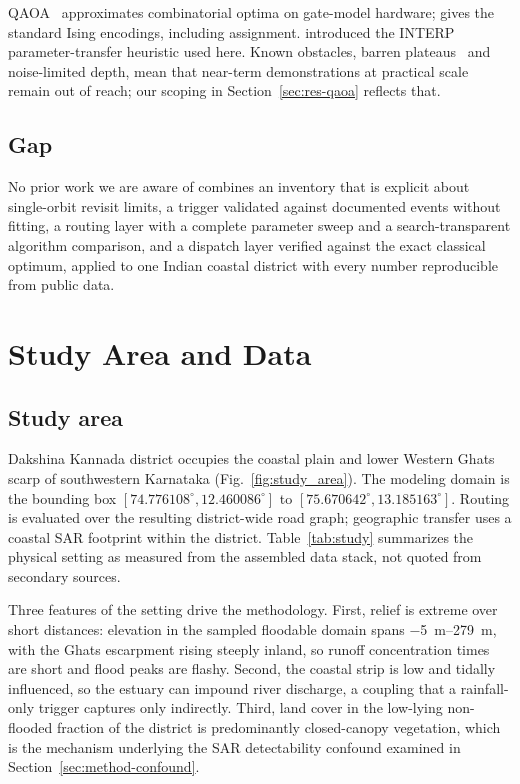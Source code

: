 \documentclass[10pt,twocolumn]{article}
\begin{document}
QAOA~\citep{farhi2014} approximates combinatorial optima on gate-model hardware;
\citet{lucas2014} gives the standard Ising encodings, including assignment.
\citet{zhou2020} introduced the INTERP parameter-transfer heuristic used here.
Known obstacles, barren plateaus~\citep{mcclean2018} and noise-limited depth,
mean that near-term demonstrations at practical scale remain out of reach; our
scoping in Section~\ref{sec:res-qaoa} reflects that.

\subsection{Gap}
No prior work we are aware of combines an inventory that is explicit about
single-orbit revisit limits, a trigger validated against documented events
without fitting, a routing layer with a complete parameter sweep and a
search-transparent algorithm comparison, and a dispatch layer verified against
the exact classical optimum, applied to one Indian coastal district with every
number reproducible from public data.

\section{Study Area and Data}
\label{sec:study}

\subsection{Study area}
Dakshina Kannada district occupies the coastal plain and lower Western Ghats
scarp of southwestern Karnataka (Fig.~\ref{fig:study_area}). The modeling
domain is the bounding box $[74.776108^\circ, 12.460086^\circ]$ to
$[75.670642^\circ, 13.185163^\circ]$. Routing is evaluated over the resulting
district-wide road graph; geographic transfer uses a coastal SAR footprint
within the district. Table~\ref{tab:study} summarizes the physical
setting as measured from the assembled data stack, not quoted from
secondary sources.

Three features of the setting drive the methodology. First, relief is extreme
over short distances: elevation in the sampled floodable domain spans
\SIrange{-5}{279}{\metre}, with the Ghats escarpment rising steeply inland, so
runoff concentration times are short and flood peaks are flashy. Second, the
coastal strip is low and tidally influenced, so the estuary can impound river
discharge, a coupling that a rainfall-only trigger captures only indirectly.
Third, land cover in the low-lying non-flooded fraction of the district is
predominantly closed-canopy vegetation, which is the mechanism underlying the
SAR detectability confound examined in Section~\ref{sec:method-confound}.
\end{document}
